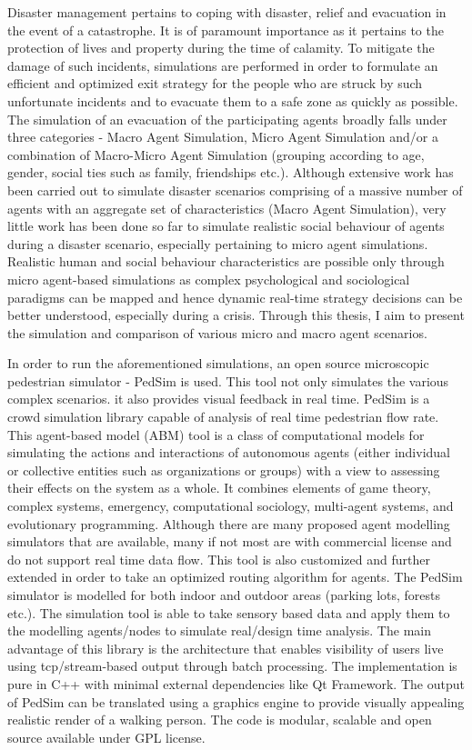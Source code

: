 Disaster management pertains to coping with disaster, relief and evacuation in the event of a catastrophe. It is of paramount importance as it pertains to the protection of lives and property during the time of calamity. To mitigate the damage of such incidents, simulations are performed in order to formulate an efficient and optimized exit strategy for the people who are struck by such unfortunate incidents and to evacuate them to a safe zone as quickly as possible. The simulation of an evacuation of the participating agents broadly falls under three categories - Macro Agent Simulation, Micro Agent Simulation and/or a combination of Macro-Micro Agent Simulation (grouping according to age, gender, social ties such as family, friendships etc.). Although extensive work has been carried out to simulate disaster scenarios comprising of a massive number of agents with an aggregate set of characteristics (Macro Agent Simulation), very little work has been done so far to simulate realistic social behaviour of agents during a disaster scenario, especially pertaining to micro agent simulations. Realistic human and social behaviour characteristics are possible only through micro agent-based simulations as complex psychological and sociological paradigms can be mapped and hence dynamic real-time strategy decisions can be better understood, especially during a crisis. Through this thesis, I aim to present the simulation and comparison of various micro and macro agent scenarios.

In order to run the aforementioned simulations, an open source microscopic pedestrian simulator - PedSim is used. This tool not only simulates the various complex scenarios. it also provides visual feedback in real time. PedSim is a crowd simulation library capable of analysis of real time pedestrian flow rate. This agent-based model (ABM) tool is a class of computational models for simulating the actions and interactions of autonomous agents (either individual or collective entities such as organizations or groups) with a view to assessing their effects on the system as a whole. It combines elements of game theory, complex systems, emergency, computational sociology, multi-agent systems, and evolutionary programming. Although there are many proposed agent modelling simulators that are available, many if not most are with commercial license and do not support real time data flow. This tool is also customized and further extended in order to take an optimized routing algorithm for agents. The PedSim simulator is modelled for both indoor and outdoor areas (parking lots, forests etc.). The simulation tool is able to take sensory based data and apply them to the modelling agents/nodes to simulate real/design time analysis. The main advantage of this library is the architecture that enables visibility of users live using tcp/stream-based output through batch processing. The implementation is pure in C++ with minimal external dependencies like Qt Framework. The output of PedSim can be translated using a graphics engine to provide visually appealing realistic render of a walking person. The code is modular, scalable and open source available under GPL license. 

